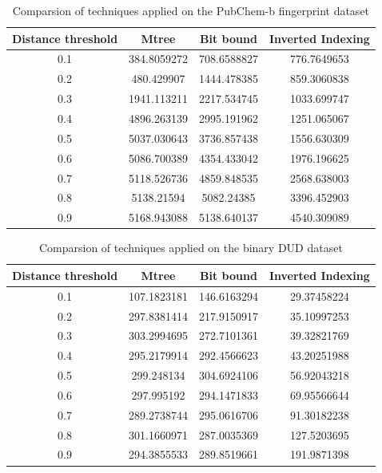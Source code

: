 \begin{table}[ht!]
\centering
\caption{Comparsion of techniques applied on the PubChem-b fingerprint dataset}
\label{tab: table2}
\begin{tabular}{|c|c|c|c|}
\hline 
Distance threshold & Mtree	& Bit bound	& 	Inverted Indexing \\
\hline
0.1 & 384.8059272 	&	708.6588827 	&	776.7649653\\
0.2 & 480.429907	  	&  	1444.478385	&	859.3060838\\
0.3 & 1941.113211 	&	2217.534745 	&	1033.699747\\
0.4	& 4896.263139 	&	2995.191962 	&	1251.065067\\
0.5	& 5037.030643 	&	3736.857438 	&	1556.630309\\
0.6	& 5086.700389 	&	4354.433042 	&	1976.196625\\
0.7	& 5118.526736 	&	4859.848535 	&	2568.638003\\
0.8	& 5138.21594	 	& 	5082.24385 	&	3396.452903\\
0.9	& 5168.943088	&	5138.640137 	&	4540.309089\\
\hline 
\end{tabular} 
\end{table}




\begin{table}[ht!]
\centering
\caption{Comparsion of techniques applied on the binary DUD dataset}
\label{tab: table3}
\begin{tabular}{|c|c|c|c|}
\hline 
Distance threshold & Mtree	& Bit bound	& 	Inverted Indexing \\
\hline
0.1 	& 107.1823181	& 146.6163294	& 	29.37458224\\
0.2 & 297.8381414	& 217.9150917	& 	35.10997253	\\
0.3 & 303.2994695	& 272.7101361	& 	39.32821769	\\
0.4 & 295.2179914	& 292.4566623	& 	43.20251988	\\
0.5 & 299.248134 	& 304.6924106	& 	56.92043218	\\
0.6 & 297.995192 	& 294.1471833	& 	69.95566644	\\
0.7 & 289.2738744	& 295.0616706	& 	91.30182238	\\
0.8	& 301.1660971	& 287.0035369	& 	127.5203695	\\
0.9 & 294.3855533	& 289.8519661	& 	191.9871398	\\
\hline 
\end{tabular} 
\end{table}


